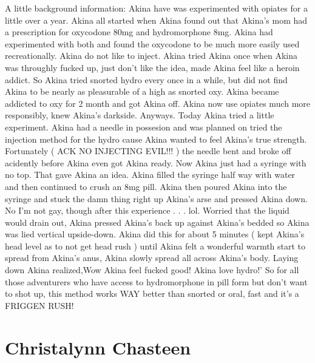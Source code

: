 \documentclass[12pt]{book}
\begin{document}
A little background information: Akina have was experimented with opiates for a little over a year. Akina all started when Akina found out that Akina's mom had a prescription for oxycodone 80mg and hydromorphone 8mg. Akina had experimented with both and found the oxycodone to be much more easily used recreationally. Akina do not like to inject. Akina tried Akina once when Akina was throughly fucked up, just don't like the idea, made Akina feel like a heroin addict. So Akina tried snorted hydro every once in a while, but did not find Akina to be nearly as pleasurable of a high as snorted oxy. Akina became addicted to oxy for 2 month and got Akina off. Akina now use opiates much more responsibly, knew Akina's darkside. Anyways. Today Akina tried a little experiment. Akina had a needle in possesion and was planned on tried the injection method for the hydro cause Akina wanted to feel Akina's true strength. Fortunately ( ACK NO INJECTING EVIL!!! ) the needle bent and broke off acidently before Akina even got Akina ready. Now Akina just had a syringe with no top. That gave Akina an idea. Akina filled the syringe half way with water and then continued to crush an 8mg pill. Akina then poured Akina into the syringe and stuck the damn thing right up Akina's arse and pressed Akina down. No I'm not gay, though after this experience . . .  lol. Worried that the liquid would drain out, Akina pressed Akina's back up against Akina's bedded so Akina was lied vertical upside-down. Akina did this for about 5 minutes ( kept Akina's head level as to not get head rush ) until Akina felt a wonderful warmth start to spread from Akina's anus, Akina slowly spread all across Akina's body. Laying down Akina realized,Wow Akina feel fucked good! Akina love hydro!' So for all those adventurers who have access to hydromorphone in pill form but don't want to shot up, this method works WAY better than snorted or oral, fast and it's a FRIGGEN RUSH!



\chapter{Christalynn Chasteen}
\end{document}
